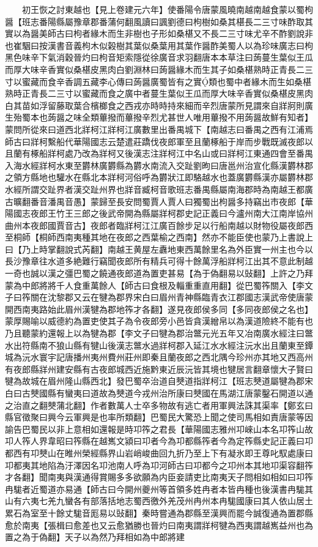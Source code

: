 　　初王恢之討東越也【見上卷建元六年】使番陽令唐蒙風曉南越南越食蒙以蜀枸醤【班志番陽縣屬豫章郡番蒲何翻風讀曰諷劉德曰枸樹如桑其椹長二三寸味酢取其實以為醤美師古曰枸者緣木而生非樹也子形如桑椹又不長二三寸味尤辛不酢劉說非也崔駰曰按漢書音義枸木似榖樹其葉似桑葉用其葉作醤酢美蜀人以為珍味廣志曰枸黑色味辛下氣消穀晉灼曰枸音矩索隱從徐廣音求羽翻唐本本草注曰蒟蔓生葉似王瓜而厚大味辛香實似桑椹皮黑肉白劉淵林曰蒟醤緣木而生其子如桑椹熟時正青長二三寸以蜜藏而食辛香調五藏李心傳曰蒟醤廣蜀皆有之實類也蜀中者緣木而生如桑椹熟時正青長二三寸以蜜藏而食之廣中者蔓生葉似王瓜而厚大味辛香實似桑椹皮黑肉白其苗如浮留藤取葉合檳榔食之西戎亦時時持來細而辛烈唐蒙所見謂來自牂牁則廣生殆蜀本也蒟醤之味全類蓽撥而蓽撥辛烈尤甚世人唯用蓽撥不用蒟醤故鮮有知者】蒙問所從來曰道西北牂柯江牂柯江廣數里出番禺城下【南越志曰番禺之西有江浦焉師古曰牂柯繫船代華陽國志云楚遣莊蹻伐夜郎軍至且蘭椓船于岸而步戰既滅夜郎以且蘭有椓船牂柯處乃改為牂柯又後漢志注牂柯江中名山或曰牂柯江東通四會至番禺入海水經牂柯水東至欝林廣欝縣為欝水南流入交趾劉昫曰唐邕州治宣化縣漢欝林郡之領方縣地也驩水在縣北本牂柯河俗呼為欝狀江即駱越水也蓋廣欝縣漢亦屬欝林郡水經所謂交趾界者漢交趾州界也牂音臧柯音歌班志番禺縣屬南海郡時為南越王都廣古曠翻番音潘禺音愚】蒙歸至長安問蜀賈人賈人曰獨蜀出枸醤多持竊出市夜郎【華陽國志夜郎王竹王三郎之後武帝開為縣屬牂柯郡史記正義曰今瀘州南大江南岸協州曲州本夜郎國賈音古】夜郎者臨牂柯江江廣百餘步足以行船南越以財物役屬夜郎西至桐師【桐師西南夷種其地在夜郎之西葉榆之西南】然亦不能臣使也蒙乃上書說上曰【乃上時掌翻說式芮翻】南越王黄屋左纛地東西萬餘里名為外臣實一州主也今以長沙豫章往水道多絶難行竊聞夜郎所有精兵可得十餘萬浮船牂柯江出其不意此制越一奇也誠以漢之彊巴蜀之饒通夜郎道為置吏甚易【為于偽翻易以䜴翻】上許之乃拜蒙為中郎將將千人食重萬餘人【師古曰食根及輜重重直用翻】從巴蜀筰關入【李文子曰筰關在沈黎郡又云在犍為郡界宋白曰眉州青神縣臨青衣江郡國志漢武帝使唐蒙開西南夷路始此眉州漢犍為郡地筰才各翻】遂見夜郎侯多同【多同夜郎侯之名也】蒙厚賜喻以威德約為置吏使其子為令夜郎旁小邑皆貪漢繒帛以為漢道險終不能有也乃且聽蒙約還報上以為犍為郡【李文子曰犍為郡治鄨元光五年又冶南廣水經注曰鄨水出符縣南不狼山縣有犍山後漢志鄨水過牂柯郡入延江水水經注沅水出且蘭東至鐔城為沅水寰宇記唐播州夷州費州莊州即秦且蘭夜郎之西北隅今珍州亦其地又西高州有夜郎縣牂州建安縣有古夜郎城西近施黔東近辰沅皆其境也犍居言翻章懷大子賢曰犍為故城在眉州隆山縣西北】發巴蜀卒治道自僰道指牂柯江【班志僰道屬犍為郡宋白曰古僰國縣有蠻夷曰道故為僰道今戎州治所康曰僰國在馬湖江唐蒙鑿石開道以通之治直之翻僰蒲北翻】作者數萬人士卒多物故有逃亡者用軍興法誅其渠率【鄭玄曰縣官徵聚曰興今云軍興是也率所類翻】巴蜀民大驚恐上聞之使司馬相如責唐蒙等因諭告巴蜀民以非上意相如還報是時卭筰之君長【華陽國志雅州卭崍山本名卭筰山故卭人筰人界韋昭曰筰縣在越嶲文潁曰卭者今為卭都縣筰者今為定筰縣史記正義曰卭都西有卭僰山在睢州榮經縣界山岩峭峻曲回九折乃至上下有凝氷即王尊叱馭處康曰卭都夷其地陷為汙澤因名卭池南人呼為卭河師古曰卭都今之卭州本其地卭渠容翻筰才各翻】聞南夷與漢通得賞賜多多欲願為内臣妾請吏比南夷天子問相如相如曰卭筰冉駹者近蜀道亦易通【師古曰今開州夔州等首領多姓冉者本皆冉種也後漢書冉駹其山有六夷七羌九蠻各有部落括地志蜀西徼外羌茂州冉州本冉駹國康曰其人依山居土累石為室至十餘丈駹音厖易以䜴翻】秦時嘗通為郡縣至漢興而罷今誠復通為置郡縣愈於南夷【張楫曰愈差也又云愈猶勝也晉灼曰南夷謂牂柯犍為西夷謂越嶲益州也為置之為于偽翻】天子以為然乃拜相如為中郎將建
